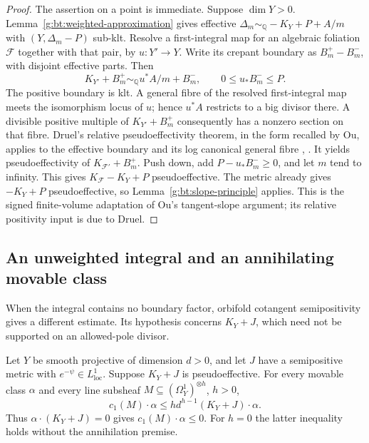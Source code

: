 \begin{proof}
The assertion on a point is immediate. Suppose $\dim Y>0$.
Lemma~\ref{g:bt:weighted-approximation} gives effective
$\Delta_m\sim_{\mathbb Q}-K_Y+P+A/m$ with
$(Y,\Delta_m-P)$ sub-klt.  Resolve a first-integral map for an algebraic
foliation $\mathcal F$ together with that pair, by $u:Y'\to Y$.
Write its crepant boundary as $B_m^+-B_m^-$, with disjoint effective
parts.  Then
\[
 K_{Y'}+B_m^+\sim_{\mathbb Q}u^*A/m+B_m^-,
 \qquad 0\leq u_*B_m^-\leq P.
\]
The positive boundary is klt.  A general fibre of the resolved
first-integral map meets the isomorphism locus of $u$; hence $u^*A$
restricts to a big divisor there.  A divisible positive multiple of
$K_{Y'}+B_m^+$ consequently has a nonzero section on that fibre.
Druel's relative pseudoeffectivity theorem, in the form recalled by Ou,
applies to the effective boundary and its log canonical general fibre
\cite[Proposition~4.1]{Druel2017},
\cite[Proposition~3.1]{Ou2023}. It yields pseudoeffectivity of
$K_{\mathcal F'}+B_m^+$.  Push down, add $P-u_*B_m^-\geq0$, and let $m$
tend to infinity.  This gives $K_{\mathcal F}-K_Y+P$ pseudoeffective.
The metric already gives $-K_Y+P$ pseudoeffective, so
Lemma~\ref{g:bt:slope-principle} applies.  This is the signed finite-volume
adaptation of Ou's tangent-slope argument; its relative positivity input
is due to Druel.
\end{proof}

\subsection{An unweighted integral and an annihilating movable class}
\label{g:bt:unweighted}

When the integral contains no boundary factor, orbifold cotangent
semipositivity gives a different estimate.  Its hypothesis concerns
$K_Y+J$, which need not be supported on an allowed-pole divisor.

\begin{proposition}
\label{g:bt:unweighted-slope}
Let $Y$ be smooth projective of dimension $d>0$, and let $J$ have a
semipositive metric with $e^{-\psi}\in L^1_{\mathrm{loc}}$.
Suppose $K_Y+J$ is pseudoeffective.  For every movable class $\alpha$
and every line subsheaf $M\subseteq(\Omega_Y^1)^{\otimes h}$, $h>0$,
\begin{equation}\label{g:bt:orbifold-bound}
 c_1(M)\cdot\alpha\leq
           h d^{h-1}(K_Y+J)\cdot\alpha.
\end{equation}
Thus $\alpha\cdot(K_Y+J)=0$ gives $c_1(M)\cdot\alpha\leq0$.
For $h=0$ the latter inequality holds without the annihilation premise.
\end{proposition}

